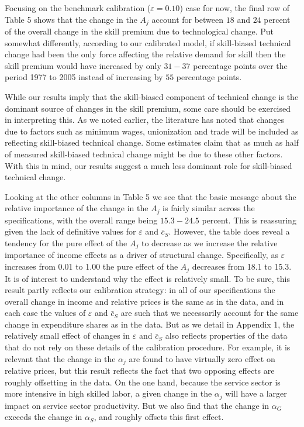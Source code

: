 \documentclass[12pt,english]{article}
\begin{document}
{\normalsize Focusing on the benchmark calibration ($\varepsilon =0.10$)
case for now, the final row of Table 5 shows that the change in the $A_{j}$
account for between $18$ and $24$ percent of the overall change in the skill
premium due to technological change. Put somewhat differently, according to
our calibrated model, if skill-biased technical change had been the only
force affecting the relative demand for skill then the skill premium would
have increased by only $31-37$ percentage points over the period 1977 to
2005 instead of increasing by $55$ percentage points. }

{\normalsize While our results imply that the skill-biased component of
technical change is the dominant source of changes in the skill premium,
some care should be exercised in interpreting this. As we noted earlier, the
literature has noted that changes due to factors such as minimum wages,
unionization and trade will be included as reflecting skill-biased technical
change. Some estimates claim that as much as half of measured skill-biased
technical change might be due to these other factors. \citep[See, for example][]{DFL96} With this in mind, our results suggest a much less
dominant role for skill-biased technical change. }

{\normalsize Looking at the other columns in Table 5 we see that the basic
message about the relative importance of the change in the $A_{j}$ is fairly
similar across the specifications, with the overall range being $15.3-24.5$
percent. This is reassuring given the lack of definitive values for $%
\varepsilon $ and $\bar{c}_{S}$. However, the table does reveal a tendency
for the pure effect of the $A_{j}$ to decrease as we increase the relative
importance of income effects as a driver of structural change. Specifically,
as }$\varepsilon $ {\normalsize increases from 0.01 to 1.00 the pure effect
of the $A_{j}$ decreases from 18.1 to 15.3. It is of interest to understand
why the effect is relatively small. To be sure, this result partly reflects
our calibration strategy: in all of our specifications the overall change in
income and relative prices is the same as in the data, and in each case the
values of $\varepsilon $ and $\bar{c}_{S}$ are such that we necessarily
account for the same change in expenditure shares as in the data. But as we
detail in Appendix 1, the relatively small effect of changes in $\varepsilon 
$ and $\bar{c}_{S}$ also reflects properties of the data that do not rely on
these details of the calibration procedure. For example, it is relevant that
the change in the }$\alpha _{j}$ {\normalsize are found to have virtually
zero effect on relative prices, but this result reflects the fact that two
opposing effects are roughly offsetting in the data. On the one hand,
because the service sector is more intensive in high skilled labor, a given
change in the }$\alpha _{j}${ \normalsize will have a larger impact on
service sector productivity. But we also find that the change in }$\alpha
_{G}$ {\normalsize exceeds the change in }$\alpha _{S}${\normalsize , and
roughly offsets this first effect.}
\end{document}
